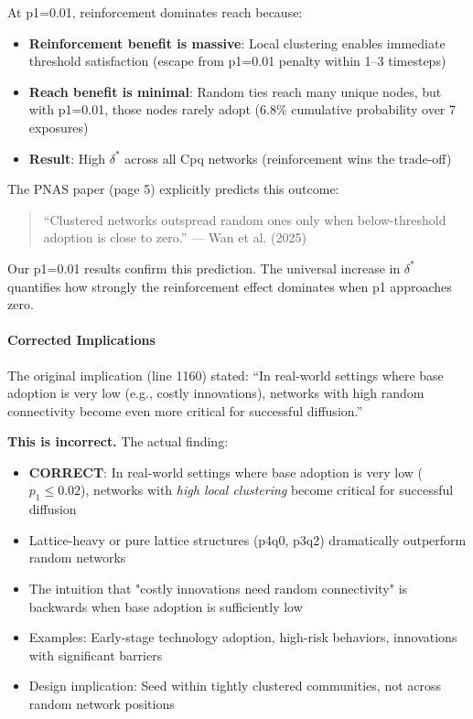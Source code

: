 \documentclass[12pt,a4paper]{article}
\begin{document}
At p1=0.01, reinforcement dominates reach because:
\begin{itemize}
    \item \textbf{Reinforcement benefit is massive}: Local clustering enables immediate threshold satisfaction (escape from p1=0.01 penalty within 1--3 timesteps)
    \item \textbf{Reach benefit is minimal}: Random ties reach many unique nodes, but with p1=0.01, those nodes rarely adopt (6.8\% cumulative probability over 7 exposures)
    \item \textbf{Result}: High $\delta^*$ across all Cpq networks (reinforcement wins the trade-off)
\end{itemize}

The PNAS paper (page 5) explicitly predicts this outcome:
\begin{quote}
``Clustered networks outspread random ones only when below-threshold adoption is close to zero.'' --- Wan et al. (2025)
\end{quote}

Our p1=0.01 results confirm this prediction. The universal increase in $\delta^*$ quantifies how strongly the reinforcement effect dominates when p1 approaches zero.

\paragraph{Corrected Implications}

The original implication (line 1160) stated: ``In real-world settings where base adoption is very low (e.g., costly innovations), networks with high random connectivity become even more critical for successful diffusion.''

\textbf{This is incorrect.} The actual finding:

\begin{itemize}
    \item \textbf{CORRECT}: In real-world settings where base adoption is very low ($p_1 \leq 0.02$), networks with \textit{high local clustering} become critical for successful diffusion
    \item Lattice-heavy or pure lattice structures (p4q0, p3q2) dramatically outperform random networks
    \item The intuition that "costly innovations need random connectivity" is backwards when base adoption is sufficiently low
    \item Examples: Early-stage technology adoption, high-risk behaviors, innovations with significant barriers
    \item Design implication: Seed within tightly clustered communities, not across random network positions
\end{itemize}
\end{document}
